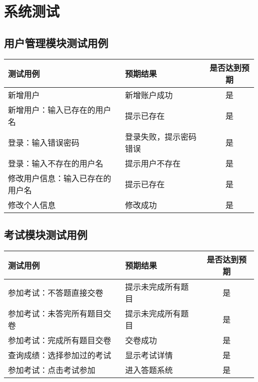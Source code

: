 \section{系统测试}
\subsection{用户管理模块测试用例}
\begin{table}[ht!]
\begin{tabularx}{\linewidth}{@{}Xlc@{}}
\toprule
测试用例        & 预期结果        & 是否达到预期 \\ 
\midrule
新增用户        & 新增账户成功      & 是      \\
新增用户：输入已存在的用户名 & 提示已存在       & 是      \\
登录：输入错误密码    & 登录失败，提示密码错误 & 是      \\
登录：输入不存在的用户名 & 提示用户不存在     & 是      \\
修改用户信息：输入已存在的用户名 & 提示已存在 & 是 \\
修改个人信息      & 修改成功        & 是      \\ 
\bottomrule
\end{tabularx}
\end{table}


\subsection{考试模块测试用例}
\begin{table}[ht!]
\begin{tabularx}{\linewidth}{@{}Xlc@{}}
\toprule
测试用例           & 预期结果      & 是否达到预期 \\ \midrule
参加考试：不答题直接交卷   & 提示未完成所有题目 & 是      \\
参加考试：未答完所有题目交卷 & 提示未完成所有题目 & 是      \\
参加考试：完成所有题目交卷  & 交卷成功      & 是      \\
查询成绩：选择参加过的考试  & 显示考试详情    & 是      \\
参加考试：点击考试参加    & 进入答题系统    & 是   \\ \bottomrule
\end{tabularx}
\end{table}

